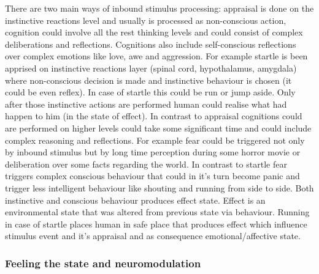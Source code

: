 There are two main ways of inbound stimulus processing: appraisal is done on the instinctive reactions level and usually is processed as non-conscious action, cognition could involve all the rest thinking levels and could consist of complex deliberations and reflections.
Cognitions also include self-conscious reflections over complex emotions like love, awe and aggression. For example startle is been apprised on instinctive reactions layer (spinal cord, hypothalamus, amygdala) where non-conscious decision is made and instinctive behaviour is chosen (it could be even reflex). In case of startle this could be run or jump aside. Only after those instinctive actions are performed human could realise what had happen to him (in the state of effect). In contrast to appraisal cognitions could are performed on higher levels could take some significant time and could include complex reasoning and reflections. For example fear could be triggered not only by inbound stimulus but by long time perception during some horror movie or deliberation over some facts regarding the world. In contrast to startle fear triggers complex conscious behaviour that could in it's turn become panic and trigger less intelligent behaviour like shouting and running from side to side. Both instinctive and conscious behaviour produces effect state. Effect is an environmental state that was altered from previous state via behaviour. Running in case of startle places human in safe place that produces effect which influence stimulus event and it's appraisal and as consequence emotional/affective state.

\subsubsection{Feeling the state and neuromodulation}

